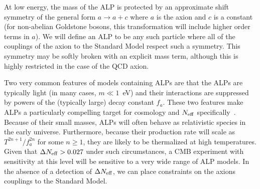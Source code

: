 At low energy, the mass of the ALP is protected by an approximate shift symmetry of the general form $a \to a + c$ where $a$ is the axion and $c$ is a constant (for non-abelian Goldstone bosons, this transformation will include higher order terms in $a$).  We will define an ALP to be any such particle where all of the couplings of the axion to the Standard Model respect such a symmetry.  This symmetry may be softly broken with an explicit mass term, although this is highly restricted in the case of the QCD axion.





Two very common features of models containing ALPs are that the ALPs are typically light (in many cases, $m \ll 1$~eV) and their interactions are suppressed by powers of the (typically large) decay constant $f_a$.  These two features make ALPs a particularly compelling target for cosmology and $N_{\rm eff}$ specifically~\cite{Brust:2013xpv,Salvio:2013iaa,Kawasaki:2015ofa,Baumann:2016wac}.  Because of their small masses, ALPs will often behave as relativistic species in the early universe.  Furthermore, because their production rate will scale as $T^{2n +1} / f_a^{2n}$ for some $n \geq 1$, they are likely to be thermalized at high temperatures.  Given that $\Delta N_{\rm eff} > 0.027$ under such circumstances, a CMB experiment with sensitivity at this level will be sensitive to a very wide range of ALP models.   In the absence of a detection of $\Delta N_{\rm eff}$, we can place constraints on the axions couplings to the Standard Model.  

